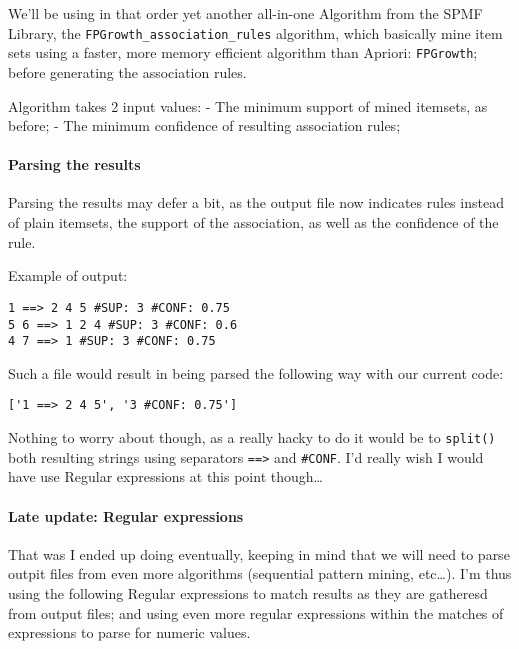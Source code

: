 \documentclass[11pt]{article}
\begin{document}
We'll be using in that order yet another all-in-one Algorithm from the
SPMF Library, the \texttt{FPGrowth\_association\_rules} algorithm, which
basically mine item sets using a faster, more memory efficient algorithm
than Apriori: \texttt{FPGrowth}; before generating the association
rules.

Algorithm takes 2 input values: - The minimum support of mined itemsets,
as before; - The minimum confidence of resulting association rules;

\hypertarget{parsing-the-results}{%
\paragraph{Parsing the results}\label{parsing-the-results}}

Parsing the results may defer a bit, as the output file now indicates
rules instead of plain itemsets, the support of the association, as well
as the confidence of the rule.

Example of output:

\begin{verbatim}
1 ==> 2 4 5 #SUP: 3 #CONF: 0.75
5 6 ==> 1 2 4 #SUP: 3 #CONF: 0.6
4 7 ==> 1 #SUP: 3 #CONF: 0.75
\end{verbatim}

Such a file would result in being parsed the following way with our
current code:

\begin{verbatim}
['1 ==> 2 4 5', '3 #CONF: 0.75']
\end{verbatim}

Nothing to worry about though, as a really hacky to do it would be to
\texttt{split()} both resulting strings using separators
\texttt{==\textgreater{}} and \texttt{\#CONF}. I'd really wish I would
have use Regular expressions at this point though\ldots{}

\hypertarget{late-update-regular-expressions}{%
\paragraph{Late update: Regular
expressions}\label{late-update-regular-expressions}}

That was I ended up doing eventually, keeping in mind that we will need
to parse outpit files from even more algorithms (sequential pattern
mining, etc\ldots{}). I'm thus using the following Regular expressions
to match results as they are gatheresd from output files; and using even
more regular expressions within the matches of expressions to parse for
numeric values.
\end{document}
